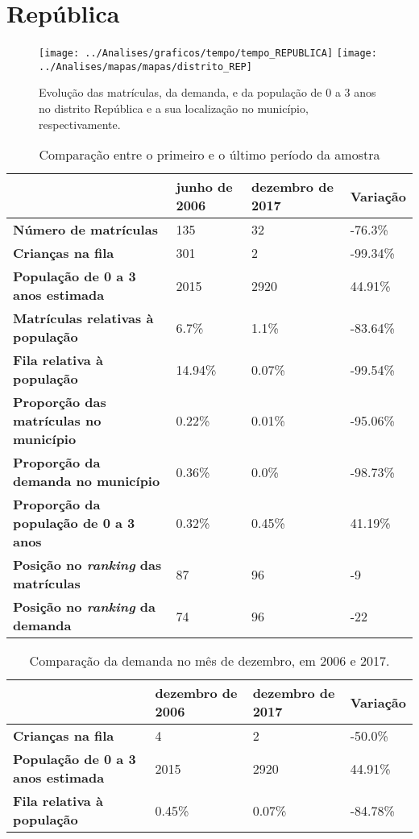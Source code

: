 \section{República}
\begin{figure}[H]
	\centering
	\texttt{[image: ../Analises/graficos/tempo/tempo\_REPUBLICA]}
	\texttt{[image: ../Analises/mapas/mapas/distrito\_REP]}
	\caption{Evolução das matrículas, da demanda, e da população de 0 a 3 anos no distrito República e a sua localização no município, respectivamente.}
\end{figure}
\begin{table}[H]
	\begin{tabular}{|l|l|l|l|}
		\hline
		\textbf{}                                      & \textbf{junho de 2006}       & \textbf{dezembro de 2017}    & \textbf{Variação} \\ \hline
		\textbf{Número de matrículas}                  & 135 & 32 & -76.3\% \\ \hline
		\textbf{Crianças na fila}                      & 301 & 2 & -99.34\% \\ \hline
		\textbf{População de 0 a 3 anos estimada}      & 2015 & 2920 & 44.91\% \\ \hline
		\textbf{Matrículas relativas à população}      & 6.7\% & 1.1\% & -83.64\% \\ \hline
		\textbf{Fila relativa à população}             & 14.94\% & 0.07\% & -99.54\% \\ \hline
		\textbf{Proporção das matrículas no município} & 0.22\% & 0.01\% & -95.06\% \\ \hline
		\textbf{Proporção da demanda no município}     & 0.36\% & 0.0\% & -98.73\% \\ \hline
		\textbf{Proporção da população de 0 a 3 anos}  & 0.32\% & 0.45\% & 41.19\% \\ \hline
		\textbf{Posição no \textit{ranking} das matrículas}     & 87 & 96 & -9 \\ \hline
		\textbf{Posição no \textit{ranking} da demanda}         & 74 & 96 & -22 \\ \hline
	\end{tabular}
	\caption{Comparação entre o primeiro e o último período da amostra}
\end{table}
\begin{table}[H]
	\begin{tabular}{|l|l|l|l|}
		\hline
		\textbf{}                                 & \textbf{dezembro de 2006} & \textbf{dezembro de 2017} & \textbf{Variação} \\ \hline
		\textbf{Crianças na fila}                      & 4 & 2 & -50.0\% \\ \hline
		\textbf{População de 0 a 3 anos estimada}      & 2015 & 2920 & 44.91\% \\ \hline
		\textbf{Fila relativa à população}             & 0.45\% & 0.07\% & -84.78\% \\ \hline
	\end{tabular}
	\caption{Comparação da demanda no mês de dezembro, em 2006 e 2017.}
\end{table}
